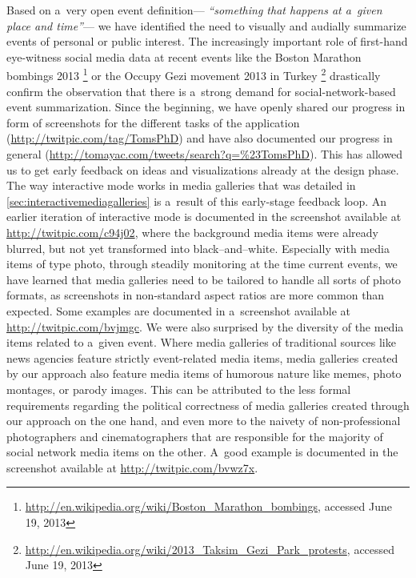 Based on a~very open event definition---%
\textit{``something that happens at a~given place and time''}---%
we have identified the need to
visually and audially summarize events
of personal or public interest.
The increasingly important role of first-hand eye-witness
social media data at recent events like the
Boston Marathon bombings 2013%
\footnote{\url{http://en.wikipedia.org/wiki/Boston_Marathon_bombings}, accessed June 19, 2013}
or the Occupy Gezi movement 2013 in Turkey%
\footnote{\url{http://en.wikipedia.org/wiki/2013_Taksim_Gezi_Park_protests}, accessed June 19, 2013}
drastically confirm the observation that there is a~strong demand
for social-network-based event summarization.
Since the beginning, we have openly shared our progress
in form of screenshots for the different tasks
of the application
(\url{http://twitpic.com/tag/TomsPhD})
and have also documented our progress in general
(\url{http://tomayac.com/tweets/search?q=%23TomsPhD}).
This has allowed us to get early feedback on ideas
and visualizations already at the design phase.
The way interactive mode works in media galleries
that was detailed in \autoref{sec:interactivemediagalleries}
is a~result of this early-stage feedback loop. 
An earlier iteration of interactive mode
is documented in the screenshot available at
\url{http://twitpic.com/c94j02},
where the background media items were already blurred,
but not yet transformed into black--and--white.
Especially with media items of type photo,
through steadily monitoring at the time current events,
we have learned that media galleries
need to be tailored to handle all sorts of photo formats,
as screenshots in non-standard aspect ratios
are more common than expected.
Some examples are documented in a~screenshot available
at \url{http://twitpic.com/bvjmgc}.
We were also surprised by the diversity of the media items
related to a~given event.
Where media galleries of traditional sources
like news agencies feature strictly event-related media items,
media galleries created by our approach also feature
media items of humorous nature like memes, photo montages,
or parody images.
This can be attributed to the less formal requirements
regarding the political correctness of media galleries 
created through our approach on the one hand,
and even more to the naivety of non-professional
photographers and cinematographers
that are responsible for the majority of social network media items on the other.
A~good example is documented in the screenshot available at
\url{http://twitpic.com/bvwz7x}.

